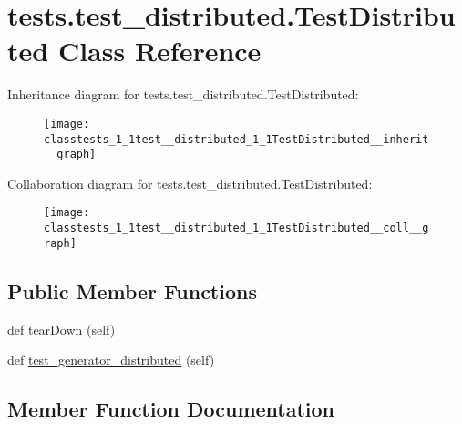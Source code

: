 \hypertarget{classtests_1_1test__distributed_1_1TestDistributed}{}\section{tests.\+test\+\_\+distributed.\+Test\+Distributed Class Reference}
\label{classtests_1_1test__distributed_1_1TestDistributed}


Inheritance diagram for tests.\+test\+\_\+distributed.\+Test\+Distributed\+:
\nopagebreak
\begin{figure}[H]
\begin{center}
\leavevmode
\texttt{[image: classtests\_1\_1test\_\_distributed\_1\_1TestDistributed\_\_inherit\_\_graph]}
\end{center}
\end{figure}


Collaboration diagram for tests.\+test\+\_\+distributed.\+Test\+Distributed\+:
\nopagebreak
\begin{figure}[H]
\begin{center}
\leavevmode
\texttt{[image: classtests\_1\_1test\_\_distributed\_1\_1TestDistributed\_\_coll\_\_graph]}
\end{center}
\end{figure}
\subsection*{Public Member Functions}
\begin{DoxyCompactItemize}
\item 
def \hyperlink{classtests_1_1test__distributed_1_1TestDistributed_aa47ac27c77ab5122dbdb7881a0feccc2}{tear\+Down} (self)
\item 
def \hyperlink{classtests_1_1test__distributed_1_1TestDistributed_ab483f9fbc8ee190aa9999994a211d0fe}{test\+\_\+generator\+\_\+distributed} (self)
\end{DoxyCompactItemize}


\subsection{Member Function Documentation}
\mbox{\label{classtests_1_1test__distributed_1_1TestDistributed_aa47ac27c77ab5122dbdb7881a0feccc2}} 
